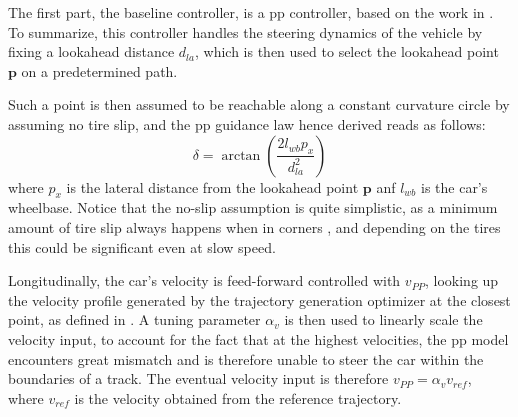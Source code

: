 \documentclass[letterpaper, conference]{IEEEtran}
\begin{document}
The first part, the baseline controller, is a \gls{pp} controller, based on the work in \cite{purepursuit}. To summarize, this controller 
handles the steering dynamics of the vehicle by fixing a lookahead distance $d_{la}$, which is then used to select the lookahead point $\mathbf{p}$ on a predetermined path. 

Such a point is then assumed to be reachable along a constant curvature circle by assuming no tire slip, and the \gls{pp} guidance law hence derived reads as follows:
\begin{equation}
    \label{eq:pp_final}
    \delta = \arctan \left( \frac{2l_{wb}p_x}{d_{la}^2} \right)
\end{equation}
where $p_x$ is the lateral distance from the lookahead point $\mathbf{p}$ anf $l_{wb}$ is the car's wheelbase.
Notice that the no-slip assumption is quite simplistic, as a minimum amount of tire slip always happens when in corners \cite{PACEJKA20121}, and depending on the tires this could be significant even at slow speed. 

Longitudinally, the car's velocity is feed-forward controlled with $v_{PP}$, looking up the velocity profile generated by the trajectory generation optimizer at the closest point, as defined in . 
A tuning parameter $\alpha_v$ is then used to linearly scale the velocity input, to account for the fact that at the highest velocities, the \gls{pp} model encounters great mismatch and is therefore unable to steer the car within the boundaries of a track. 
The eventual velocity input is therefore $v_{PP}=\alpha_v v_{ref}$, where $v_{ref}$ is the velocity obtained from the reference trajectory. 
\end{document}
